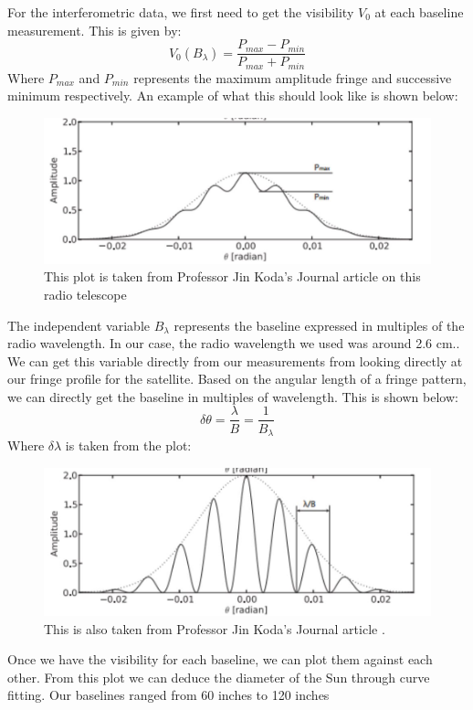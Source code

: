 \documentclass{aastex61}
\begin{document}
For the interferometric data, we first need to get the visibility $V_{0}$ at each baseline measurement. This is given by:
\begin{equation}
	V_{0}(B_{\lambda}) = \frac{P_{max}-P_{min}}{P_{max}+P_{min}}
\end{equation}
Where $P_{max}$ and $P_{min}$ represents the maximum amplitude fringe and successive minimum respectively. An example of what this should look like is shown below:
\begin{figure}[hbt!]
	\centering
	\includegraphics[scale = .45]{aaaa.jpg}
	\caption{This plot is taken from Professor Jin Koda's Journal article on this radio telescope \cite{2016AmJPh..84..249K}}
	\label{fig: refcurve1}
\end{figure}
The independent variable $B_{\lambda}$ represents the baseline expressed in multiples of the radio wavelength. In our case, the radio wavelength we used was around 2.6 cm.. We can get this variable directly from our measurements from looking directly at our fringe profile for the satellite. Based on the angular length of a fringe pattern, we can directly get the baseline in multiples of wavelength. This is shown below:
\begin{equation}
	\delta\theta = \frac{\lambda}{B} = \frac{1}{B_{\lambda}}
\end{equation}
Where $\delta\lambda$ is taken from the plot:
\begin{figure}[hbt!]
	\centering
	\includegraphics[scale = .45]{assssssssssssss.jpg}
	\caption{This is also taken from Professor Jin Koda's Journal article \cite{2016AmJPh..84..249K}.}
	\label{fig: refcurve1}
\end{figure}
Once we have the visibility for each baseline, we can plot them against each other. From this plot we can deduce the diameter of the Sun through curve fitting. Our baselines ranged from 60 inches to 120 inches
\end{document}
